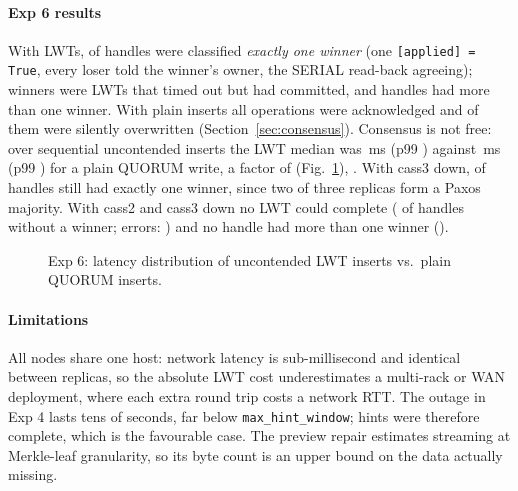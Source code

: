 \paragraph{Exp 6 results}
With LWTs,  of  handles were classified
\emph{exactly one winner} (one \texttt{[applied] = True}, every loser told the winner's owner,
the SERIAL read-back agreeing);  winners were LWTs that timed out
but had committed, and  handles had more than one winner.
 With plain inserts all 
operations were acknowledged and  of them were silently
overwritten (Section~\ref{sec:consensus}). Consensus is not free: over 
sequential uncontended inserts the LWT median was \,ms (p99
) against \,ms (p99 ) for a
plain QUORUM write, a factor of  (Fig.~\ref{fig:lwt}), . With cass3 down,  of
 handles still had exactly one winner, since two of three replicas form a
Paxos majority. With cass2 and cass3 down no LWT could complete ( of
 handles without a winner; errors: ) and no handle had
more than one winner (). 

\begin{figure}[t]\centering
{}
\caption{Exp 6: latency distribution of uncontended LWT inserts vs.\ plain QUORUM inserts.}
\label{fig:lwt}
\end{figure}

\paragraph{Limitations}
All nodes share one host: network latency is sub-millisecond and identical between replicas,
so the absolute LWT cost underestimates a multi-rack or WAN deployment, where each extra round
trip costs a network RTT. The outage in Exp 4 lasts tens of seconds, far below
\texttt{max\_hint\_window}; hints were therefore complete, which is the favourable case. The
preview repair estimates streaming at Merkle-leaf granularity, so its byte count is an upper
bound on the data actually missing.
